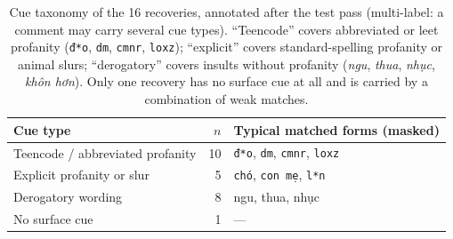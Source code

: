 \begin{table}[t]
\centering
\small
\setlength{\tabcolsep}{5pt}
\caption{Cue taxonomy of the 16 \hate{} recoveries, annotated after the test
pass (multi-label: a comment may carry several cue types). ``Teencode'' covers
abbreviated or leet profanity (\texttt{đ*o}, \texttt{dm}, \texttt{cmnr},
\texttt{loxz}); ``explicit'' covers standard-spelling profanity or animal slurs;
``derogatory'' covers insults without profanity (\emph{ngu}, \emph{thua},
\emph{nhục}, \emph{khôn hơn}). Only one recovery has no surface cue at
all and is carried by a combination of weak matches.}
\label{tab:cue-taxonomy}
\begin{tabular}{lrl}
\toprule
Cue type & $n$ & Typical matched forms (masked) \\
\midrule
Teencode / abbreviated profanity & 10 & \texttt{đ*o}, \texttt{dm}, \texttt{cmnr}, \texttt{loxz} \\
Explicit profanity or slur      &  5 & \texttt{chó}, \texttt{con mẹ}, \texttt{l*n} \\
Derogatory wording              &  8 & ngu, thua, nhục \\
No surface cue                  &  1 & --- \\
\bottomrule
\end{tabular}
\end{table}
